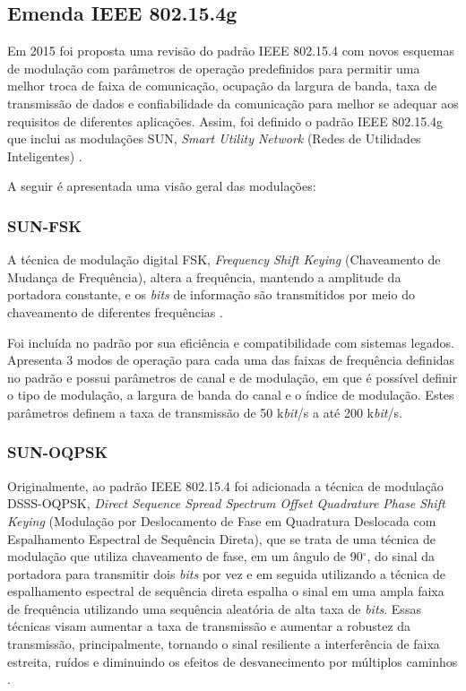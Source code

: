 \subsection{Emenda IEEE 802.15.4g}
Em 2015 foi proposta uma revisão do padrão IEEE 802.15.4 com novos esquemas de modulação com parâmetros de operação predefinidos para permitir uma melhor troca de faixa de comunicação, ocupação da largura de banda, taxa de transmissão de dados e confiabilidade da comunicação para melhor se adequar aos requisitos de diferentes aplicações. Assim, foi definido o padrão IEEE 802.15.4g que inclui as modulações SUN, \emph{Smart Utility Network} (Redes de Utilidades Inteligentes) \cite{tuset2020reliability}.

A seguir é apresentada uma visão geral das modulações:

\subsubsection{SUN-FSK}
A técnica de modulação digital FSK, \emph{Frequency Shift Keying} (Chaveamento de Mudança de Frequência), altera a frequência, mantendo a amplitude da portadora constante, e os \emph{bits} de informação são transmitidos por meio do chaveamento de diferentes frequências \cite{lathi2012}.

Foi incluída no padrão por sua eficiência e compatibilidade com sistemas legados. Apresenta 3 modos de operação para cada uma das faixas de frequência definidas no padrão e possui parâmetros de canal e de modulação, em que é possível definir o tipo de modulação, a largura de banda do canal e o índice de modulação. Estes parâmetros definem a taxa de transmissão de 50 k\emph{bit}/s a até 200 k\emph{bit}/s.

\subsubsection{SUN-OQPSK}
Originalmente, ao padrão IEEE 802.15.4 foi adicionada a técnica de modulação DSSS-OQPSK, \emph{Direct Sequence Spread Spectrum Offset Quadrature Phase Shift Keying} (Modulação por Deslocamento de Fase em Quadratura Deslocada com Espalhamento Espectral de Sequência Direta), que se trata de uma técnica de modulação que utiliza chaveamento de fase, em um ângulo de 90$^{\circ}$, do sinal da portadora para transmitir dois \emph{bits} por vez e em seguida utilizando a técnica de espalhamento espectral de sequência direta espalha o sinal em uma ampla faixa de frequência utilizando uma sequência aleatória de alta taxa de \emph{bits}. Essas técnicas visam aumentar a taxa de transmissão e aumentar a robustez da transmissão, principalmente, tornando o sinal resiliente a interferência de faixa estreita, ruídos e diminuindo os efeitos de desvanecimento por múltiplos caminhos \cite{goldsmith2005wireless}.

